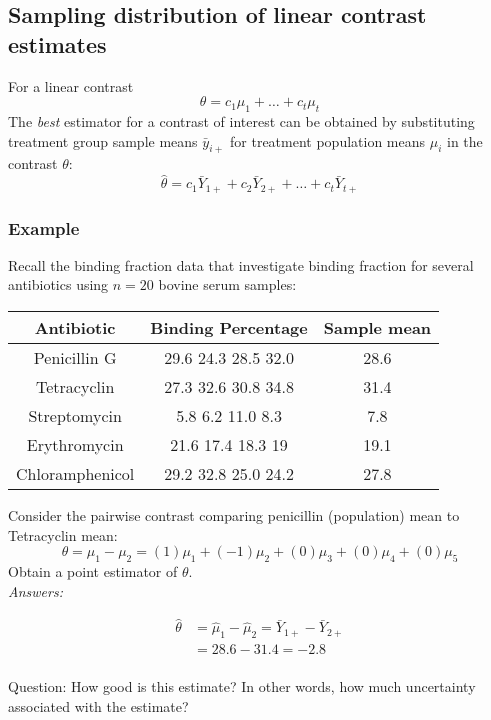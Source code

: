 \subsection*{Sampling distribution of linear contrast estimates}
For a linear contrast
$$
\theta = c_1 \mu_1 + \dots + c_t \mu_t
$$
The {\it best} estimator for a contrast of interest can be obtained by substituting treatment group sample means $\bar{y}_{i+}$ for treatment population means $\mu_i$ in the contrast $\theta$:
$$
\hat{\theta} = c_1 \bar{Y}_{1+} + c_2 \bar{Y}_{2+} + \dots + c_t \bar{Y}_{t+}
$$

\subsubsection*{Example}
Recall the binding fraction data that investigate binding fraction for several antibiotics using $n = 20$ bovine serum samples:
\begin{table}[H]
	\centering
	\begin{tabular}{c|c|c}
		\toprule
		Antibiotic & Binding Percentage & Sample mean \\
		\hline
		Penicillin G & 29.6 24.3 28.5 32.0 & 28.6\\
		Tetracyclin & 27.3 32.6 30.8 34.8 & 31.4\\
		Streptomycin & 5.8 6.2 11.0 8.3 & 7.8\\
		Erythromycin & 21.6 17.4 18.3 19 & 19.1\\
		Chloramphenicol & 29.2 32.8 25.0 24.2&27.8\\
		\bottomrule
	\end{tabular}
\end{table}

Consider the pairwise contrast comparing penicillin (population) mean to Tetracyclin mean:
$$
\theta = \mu_1 - \mu_2 = (1) \mu_1 + (-1) \mu_2 + (0) \mu_3 + (0) \mu_4 + (0) \mu_5
$$
Obtain a point estimator of $\theta$.\\
{\it Answers:}\\
\begin{pf}
	$$
	\begin{aligned}
		\hat{\theta} &= \hat{\mu}_1 - \hat{\mu}_2 = \bar{Y}_{1+} - \bar{Y}_{2+}\\
		&= 28.6 - 31.4 = -2.8\\
	\end{aligned}
	$$
\end{pf}

Question: How good is this estimate?  In other words, how much uncertainty associated with the estimate?


